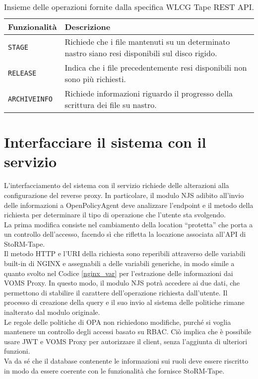 \begin{table}
\begin{center}
\begin{tabular}{ | m{7em} | m{18em} | } 
  \hline
  \textbf{Funzionalità} & \textbf{Descrizione} \\ 
  \hline
  \texttt{STAGE} & Richiede che i file mantenuti su un determinato nastro siano resi disponibili sul disco rigido. \\ 
  \hline
  \texttt{RELEASE} & Indica che i file precedentemente resi disponibili non sono più richiesti. \\ 
  \hline
  \texttt{ARCHIVEINFO} & Richiede informazioni riguardo il progresso della scrittura dei file su nastro. \\ 
  \hline
\end{tabular}
\caption{\label{tab:table-name}Insieme delle operazioni fornite dalla specifica WLCG Tape REST API.}
\end{center}
\end{table}

\section{Interfacciare il sistema con il servizio}
L'interfacciamento del sistema con il servizio richiede delle alterazioni alla configurazione del reverse proxy. In particolare, 
il modulo NJS adibito all'invio delle informazioni a OpenPolicyAgent deve analizzare l'endpoint e il metodo della richiesta per 
determinare il tipo di operazione che l'utente sta svolgendo.
\\ La prima modifica consiste nel cambiamento della location ``protetta'' che porta a un controllo dell'accesso, 
facendo sì che rifletta la locazione associata all'API di StoRM-Tape.  
\\ Il metodo HTTP e l'URI della richiesta sono reperibili attraverso delle variabili built-in di NGINX e assegnabili 
a delle variabili generiche, in modo simile a quanto svolto
nel Codice \ref*{nginx_var} per l'estrazione delle informazioni dai VOMS Proxy. In questo modo, il modulo NJS potrà accedere ai due dati,
 che permettono di stabilire il carattere dell'operazione richiesta dall'utente. Il processo di creazione della query e il suo invio al
  sistema delle politiche rimane inalterato dal modulo originale. 
\\ Le regole delle politiche di OPA non richiedono modifiche, purché si voglia mantenere un controllo degli accessi basato su RBAC. Ciò implica che è possibile usare JWT e VOMS Proxy 
per autorizzare il client, senza l'aggiunta di ulteriori funzioni. 
\\ Va da sé che il database contenente le informazioni sui ruoli deve essere riscritto in modo da essere coerente con 
le funzionalità che fornisce StoRM-Tape. 

